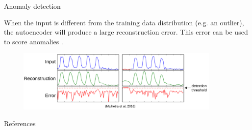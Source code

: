 \documentclass{beamer}
\begin{document}
  \begin{frame}{Anomaly detection}
    
    When the input is different from the training data distribution (e.g. an outlier), the autoencoder will produce a large reconstruction error. This error can be used to \alert{score anomalies} \cite{Malhotra2016}.

    \begin{figure}
      \includegraphics[width=10cm]{rc/anomaly-detection}
    \end{figure}

  \end{frame}

  \appendix

  \begin{frame}[allowframebreaks]{References}
    
    
    
  
  \end{frame}
\end{document}
